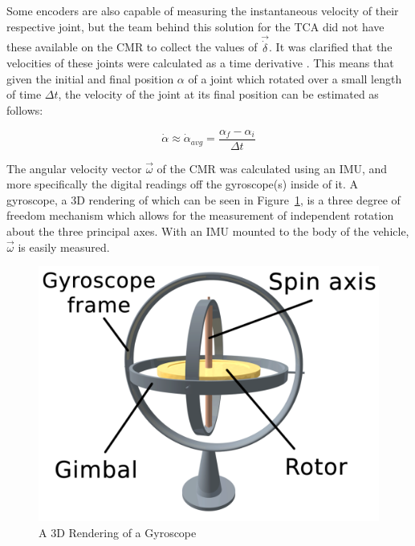 Some encoders are also capable of measuring the instantaneous velocity of their respective joint, but the team behind this solution for the \ac{TCA} did not have these available on the \ac{CMR} to collect the values of $\vec{\dot{\delta}}$. It was clarified that the velocities of these joints were calculated as a time derivative \cite{tractl}. This means that given the initial and final position $\alpha$ of a joint which rotated over a small length of time $\Delta t$, the velocity of the joint at its final position can be estimated as follows:

\begin{equation}
	\dot{\alpha} \approx \dot{\alpha}_{avg} = \frac{\alpha_{f} - \alpha_{i}}{\Delta t}
\end{equation}

The angular velocity vector $\vec{\omega}$ of the \ac{CMR} was calculated using an \ac{IMU}, and more specifically the digital readings off the gyroscope(s) inside of it. A gyroscope, a 3D rendering of which can be seen in Figure~\ref{traction_control:algorithms:gyro}, is a three degree of freedom mechanism which allows for the measurement of independent rotation about the three principal axes. With an \ac{IMU} mounted to the body of the vehicle, $\vec{\omega}$ is easily measured.

\begin{figure}[htbp]
	\centering
	\includegraphics[width=.5\textwidth]{sections/algorithms/images/gyroscope.png}
	\caption{A 3D Rendering of a Gyroscope}
	\label{traction_control:algorithms:gyro}
\end{figure}
